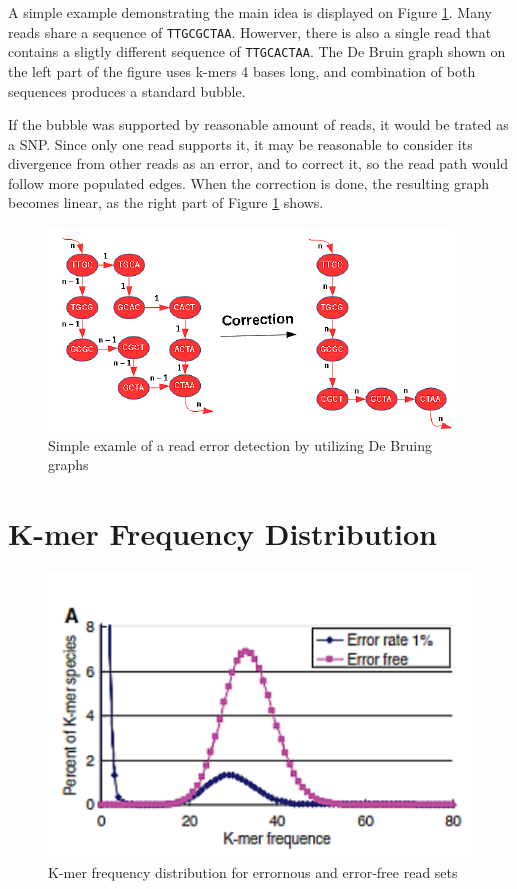 A simple example demonstrating the main idea is displayed on Figure \ref{fig:error-correction-db}. Many reads share a sequence of \texttt{TTGCGCTAA}. Howerver, there is also a single read that contains a sligtly different sequence of \texttt{TTGCACTAA}. The De Bruin graph shown on the left part of the figure uses k-mers 4 bases long, and combination of both sequences produces a standard bubble.

If the bubble was supported by reasonable amount of reads, it would be trated as a SNP. Since only one read supports it, it may be reasonable to consider its divergence from other reads as an error, and to correct it, so the read path would follow more populated edges. When the correction is done, the resulting graph becomes linear, as the right part of Figure \ref{fig:error-correction-db} shows.

\begin{figure}[h]
	\centering
	\includegraphics{img/error-correction-db.pdf}
	\caption{Simple examle of a read error detection by utilizing De Bruing graphs}
	\label{fig:error-correction-db}
\end{figure}

\section{K-mer Frequency Distribution}
\label{sec:ec-kmer-frequency-distribution}

\begin{figure}[h]
	\centering
	\includegraphics{img/kmer-frequency-distribution.pdf}
	\caption{K-mer frequency distribution for errornous and error-free read sets}
	\label{fig:kmer-frequency-distribution}
\end{figure}
